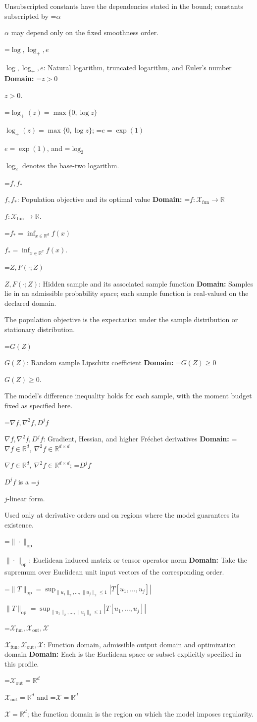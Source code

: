 \documentclass[10pt,a4paper]{article}
\newcommand{\AtlasMath}[1]{\par\begingroup\centering\setbox0=\hbox{$\displaystyle #1$}\ifdim\wd0>1.4\linewidth\typeout{ATLAS WIDE FORMULA: \the\wd0}\fi\ifdim\wd0>\linewidth\resizebox{\linewidth}{!}{\box0}\else\box0\fi\par\endgroup}
\newcommand{\AtlasInlineMath}[1]{\begingroup\setbox0=\hbox{$#1$}\ifdim\wd0>.4\linewidth\endgroup\AtlasMath{#1}\else\endgroup$#1$\fi}
\begin{document}
Unsubscripted constants have the dependencies stated in the bound; constants subscripted by \AtlasInlineMath{\alpha} may depend only on the fixed smoothness order.

\AtlasInlineMath{\log,\log_+,e}: Natural logarithm, truncated logarithm, and Euler's number \textbf{Domain:} \AtlasInlineMath{z>0}.

\AtlasInlineMath{\log_+(z)=\max\{0,\log z\}}; \AtlasInlineMath{e=\exp(1)}, and \AtlasInlineMath{\log_2} denotes the base-two logarithm.

\AtlasInlineMath{f,f_*}: Population objective and its optimal value \textbf{Domain:} \AtlasInlineMath{f:\mathcal{X}_{\mathrm{fun}}\to\mathbb{R}}.

\AtlasInlineMath{f_*=\inf_{x\in \mathbb{R}^d}f(x)}.

\AtlasInlineMath{Z,F(\cdot;Z)}: Hidden sample and its associated sample function \textbf{Domain:} Samples lie in an admissible probability space; each sample function is real-valued on the declared domain.

The population objective is the expectation under the sample distribution or stationary distribution.

\AtlasInlineMath{G(Z)}: Random sample Lipschitz coefficient \textbf{Domain:} \AtlasInlineMath{G(Z)\ge0}.

The model's difference inequality holds for each sample, with the moment budget fixed as specified here.

\AtlasInlineMath{\nabla f,\nabla^2f,D^jf}: Gradient, Hessian, and higher Fréchet derivatives \textbf{Domain:} \AtlasInlineMath{\nabla f\in\mathbb{R}^d,\ \nabla^2f\in\mathbb{R}^{d\times d}}; \AtlasInlineMath{D^jf} is a \AtlasInlineMath{j}-linear form.

Used only at derivative orders and on regions where the model guarantees its existence.

\AtlasInlineMath{\|\cdot\|_{\mathrm{op}}}: Euclidean induced matrix or tensor operator norm \textbf{Domain:} Take the supremum over Euclidean unit input vectors of the corresponding order.

\AtlasInlineMath{\|T\|_{\mathrm{op}}=\sup_{\|u_1\|_2,\ldots,\|u_j\|_2\le1}|T[u_1,\ldots,u_j]|}

\AtlasInlineMath{\mathcal{X}_{\mathrm{fun}},\mathcal{X}_{\mathrm{out}},\mathcal{X}}: Function domain, admissible output domain and optimization domain \textbf{Domain:} Each is the Euclidean space or subset explicitly specified in this profile.

\AtlasInlineMath{\mathcal{X}_{\mathrm{out}}=\mathbb{R}^d} and \AtlasInlineMath{\mathcal{X}=\mathbb{R}^d}; the function domain is the region on which the model imposes regularity.
\end{document}
